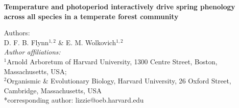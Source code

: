 \documentclass[11pt]{article}
\begin{document}
 
  
\textbf{\large{Temperature and photoperiod interactively drive spring phenology across all species in a temperate forest community}}

Authors:\\
D. F. B. Flynn$^{1,2}$ \& E. M. Wolkovich$^{1,2}$
\vspace{2ex}\\
\emph{Author affiliations:}\\
$^{1}$Arnold Arboretum of Harvard University, 1300 Centre Street, Boston, Massachusetts, USA; \\
$^{2}$Organismic \& Evolutionary Biology, Harvard University, 26 Oxford Street, Cambridge, Massachusetts, USA
\vspace{2ex}\\
*corresponding author: lizzie@oeb.harvard.edu


\newpage
{}
\end{document}
